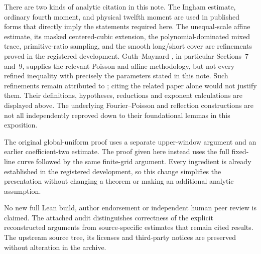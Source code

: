 \documentclass[11pt,a4paper,oneside]{article}
\theoremstyle{definition}
\numberwithin{equation}{section}
\begin{document}
There are two kinds of analytic citation in this note. The Ingham estimate, ordinary fourth moment, and physical twelfth moment are used in published forms that directly imply the statements required here. The unequal-scale affine estimate, its masked centered-cubic extension, the polynomial-dominated mixed trace, primitive-ratio sampling, and the smooth long/short cover are refinements proved in the registered development. Guth--Maynard \cite{GuthMaynard}, in particular Sections~7 and~9, supplies the relevant Poisson and affine methodology, but not every refined inequality with precisely the parameters stated in this note. Such refinements remain attributed to \cite{Lewko}; citing the related paper alone would not justify them. Their definitions, hypotheses, reductions and exponent calculations are displayed above. The underlying Fourier--Poisson and reflection constructions are not all independently reproved down to their foundational lemmas in this exposition.

The original global-uniform proof uses a separate upper-window argument and an earlier coefficient-two estimate. The proof given here instead uses the full fixed-line curve followed by the same finite-grid argument. Every ingredient is already established in the registered development, so this change simplifies the presentation without changing a theorem or making an additional analytic assumption.

No new full Lean build, author endorsement or independent human peer review is claimed. The attached audit distinguishes correctness of the explicit reconstructed arguments from source-specific estimates that remain cited results. The upstream source tree, its licenses and third-party notices are preserved without alteration in the archive.
\end{document}
